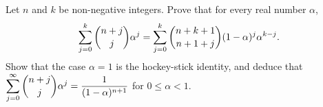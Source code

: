Let $n$ and $k$ be non-negative integers. Prove that for every real number $\alpha$,
\[
\sum_{j=0}^{k}\dbinom{n+j}{j}\alpha^j=\sum_{j=0}^{k}\dbinom{n+k+1}{n+1+j}(1-\alpha)^j\alpha^{k-j}.
\]
Show that the case $\alpha=1$ is the hockey-stick identity, and deduce that $\displaystyle\sum_{j=0}^{\infty}\dbinom{n+j}{j}\alpha^j=\dfrac{1}{(1-\alpha)^{n+1}}$ for $0\le\alpha<1$.
